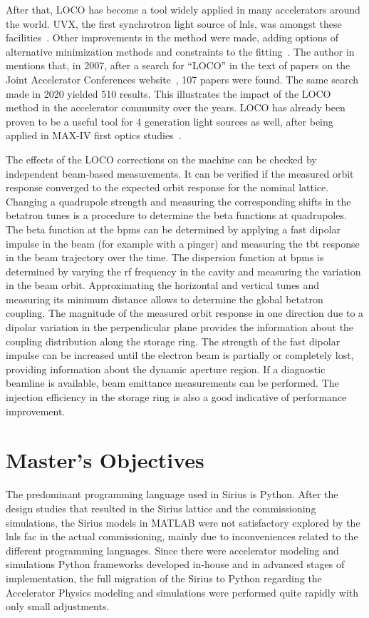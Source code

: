 After that, LOCO has become a tool widely applied in many accelerators around the world. UVX, the first synchrotron light source of \gls{lnls}, was amongst these facilities~\cite{resende2010}. Other improvements in the method were made, adding options of alternative minimization methods and constraints to the fitting~\cite{icfa_huang}. The author in~\cite{icfa_safranek} mentions that, in 2007, after a search for ``LOCO'' in the text of papers on the Joint Accelerator Conferences website~\cite{jacow}, 107 papers were found. The same search made in 2020 yielded 510 results. This illustrates the impact of the LOCO method in the accelerator community over the years. LOCO has already been proven to be a useful tool for 4 generation light sources as well, after being applied in MAX-IV first optics studies~\cite{leemann2017}.

The effects of the LOCO corrections on the machine can be checked by independent beam-based measurements. It can be verified if the measured orbit response converged to the expected orbit response for the nominal lattice. Changing a quadrupole strength and measuring the corresponding shifts in the betatron tunes is a procedure to determine the beta functions at quadrupoles. The beta function at the \glspl{bpm} can be determined by applying a fast dipolar impulse in the beam (for example with a pinger) and measuring the \gls{tbt} response in the beam trajectory over the time. The dispersion function at \glspl{bpm} is determined by varying the \gls{rf} frequency in the cavity and measuring the variation in the beam orbit. Approximating the horizontal and vertical tunes and measuring its minimum distance allows to determine the global betatron coupling. The magnitude of the measured orbit response in one direction due to a dipolar variation in the perpendicular plane provides the information about the coupling distribution along the storage ring. The strength of the fast dipolar impulse can be increased until the electron beam is partially or completely lost, providing information about the dynamic aperture region. If a diagnostic beamline is available, beam emittance measurements can be performed. The injection efficiency in the storage ring is also a good indicative of performance improvement.
\section{Master's Objectives}\label{sec:master_obj}
The predominant programming language used in Sirius is Python. After the design studies that resulted in the Sirius lattice and the commissioning simulations, the Sirius models in MATLAB were not satisfactory explored by the \gls{lnls} \gls{fac} in the actual commissioning, mainly due to inconveniences related to the different programming languages. Since there were accelerator modeling and simulations Python frameworks developed in-house and in advanced stages of implementation, the full migration of the Sirius to Python regarding the Accelerator Physics modeling and simulations were performed quite rapidly with only small adjustments.
 
